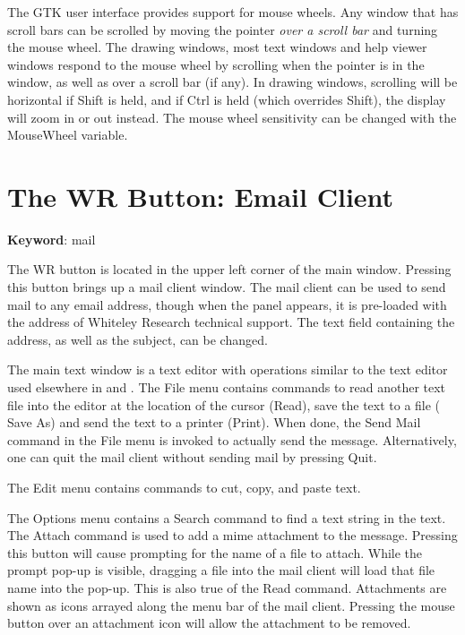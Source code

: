 The GTK user interface provides support for mouse wheels.  Any window
that has scroll bars can be scrolled by moving the pointer {\it over a
scroll bar} and turning the mouse wheel.  The drawing windows, most
text windows and help viewer windows respond to the mouse wheel by
scrolling when the pointer is in the window, as well as over a scroll
bar (if any).  In drawing windows, scrolling will be horizontal if
{\kb Shift} is held, and if {\kb Ctrl} is held (which overrides {\kb
Shift}), the display will zoom in or out instead.  The mouse wheel
sensitivity can be changed with the {\et MouseWheel} variable.


\section{The {\cb WR} Button: Email Client}
\label{wrbutton}

{\bf Keyword}: {\vt mail}

The {\cb WR} button is located in the upper left corner of the {\Xic}
main window.  Pressing this button brings up a mail client window. 
The mail client can be used to send mail to any email address, though
when the panel appears, it is pre-loaded with the address of Whiteley
Research technical support.  The text field containing the address, as
well as the subject, can be changed.

The main text window is a text editor with operations similar to the
text editor used elsewhere in {\Xic} and {\WRspice}.  The {\cb File}
menu contains commands to read another text file into the editor at
the location of the cursor ({\cb Read}), save the text to a file ({\cb
Save As}) and send the text to a printer ({\cb Print}).  When done,
the {\cb Send Mail} command in the {\cb File} menu is invoked to
actually send the message.  Alternatively, one can quit the mail
client without sending mail by pressing {\cb Quit}.

The {\cb Edit} menu contains commands to cut, copy, and paste text.

The {\cb Options} menu contains a {\cb Search} command to find a text
string in the text.  The {\cb Attach} command is used to add a {\et mime}
attachment to the message.  Pressing this button will cause prompting
for the name of a file to attach.  While the prompt pop-up is visible,
dragging a file into the mail client will load that file name into the
pop-up.  This is also true of the {\cb Read} command.  Attachments are
shown as icons arrayed along the menu bar of the mail client. 
Pressing the mouse button over an attachment icon will allow the
attachment to be removed.


